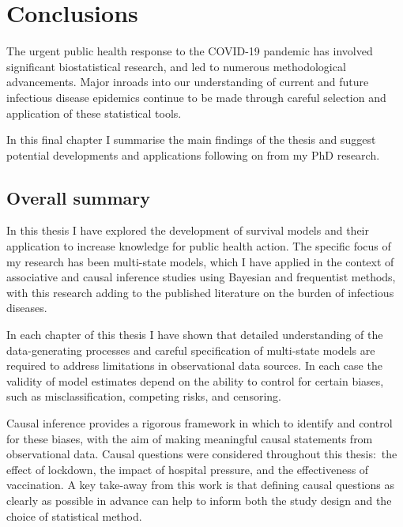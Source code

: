 \chapter{Conclusions}\label{cha:conclusions}

The urgent public health response to the COVID-19 pandemic has involved significant biostatistical research, and led to numerous methodological advancements. Major inroads into our understanding of current and future infectious disease epidemics continue to be made through careful selection and application of these statistical tools.

In this final chapter I summarise the main findings of the thesis and suggest potential developments and applications following on from my PhD research.

\section{Overall summary}

In this thesis I have explored the development of survival models and their application to increase knowledge for public health action. The specific focus of my research has been multi-state models, which I have applied in the context of associative and causal inference studies using Bayesian and frequentist methods, with this research adding to the published literature on the burden of infectious diseases.

In each chapter of this thesis I have shown that detailed understanding of the data-generating processes and careful specification of multi-state models are required to address limitations in observational data sources. In each case the validity of model estimates depend on the ability to control for certain biases, such as misclassification, competing risks, and censoring.

Causal inference provides a rigorous framework in which to identify and control for these biases, with the aim of making meaningful causal statements from observational data. Causal questions were considered throughout this thesis:\ the effect of lockdown, the impact of hospital pressure, and the effectiveness of vaccination. A key take-away from this work is that defining causal questions as clearly as possible in advance can help to inform both the study design and the choice of statistical method.

